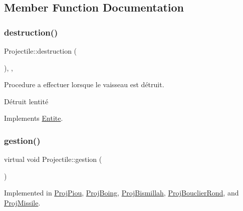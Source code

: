 \subsection{Member Function Documentation}
\mbox{\label{class_projectile_a092690ef6f0f9284e05b775f26833c2d}} 
\subsubsection{\texorpdfstring{destruction()}{destruction()}}
{\footnotesize\ttfamily Projectile\+::destruction (\begin{DoxyParamCaption}{ }\end{DoxyParamCaption})\hspace{0.3cm}{\ttfamily [inline]}, {\ttfamily [override]}, {\ttfamily [virtual]}}



Procedure a effectuer lorsque le vaisseau est détruit. 

Détruit l\textquotesingle{}entité 

Implements \mbox{\hyperlink{class_entite_af5c424f69b2c880ae9c12786abd28592}{Entite}}.

\mbox{\label{class_projectile_ad8fae955389ff8944830e9d80e0f1ce1}} 
\subsubsection{\texorpdfstring{gestion()}{gestion()}}
{\footnotesize\ttfamily virtual void Projectile\+::gestion (\begin{DoxyParamCaption}{ }\end{DoxyParamCaption})\hspace{0.3cm}{\ttfamily [pure virtual]}}



Implemented in \mbox{\hyperlink{class_proj_piou_aa25660500d188f1085f8289db91a6170}{Proj\+Piou}}, \mbox{\hyperlink{class_proj_boing_ac0d11abb68efb90dba3529d2bf1ce4f2}{Proj\+Boing}}, \mbox{\hyperlink{class_proj_bismillah_a5a037871dddbe729c926e7d9eb69b026}{Proj\+Bismillah}}, \mbox{\hyperlink{class_proj_bouclier_rond_a13656b7dbcd9cac9a5df9baeab430103}{Proj\+Bouclier\+Rond}}, and \mbox{\hyperlink{class_proj_missile_a90bee0454d77d2846431f2c8704e2d11}{Proj\+Missile}}.


